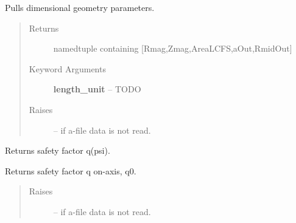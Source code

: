 \documentclass[letterpaper,10pt,english]{sphinxmanual}
\begin{document}
\begin{fulllineitems}
\begin{fulllineitems}
\begin{quote}
\begin{description}
\end{description}\end{quote}

\end{fulllineitems}


\begin{fulllineitems}
\label{eqtools:eqtools.eqdskreader.EqdskReader.getGeometry}
Pulls dimensional geometry parameters.
\begin{quote}\begin{description}
\item[{Returns}] \leavevmode
namedtuple containing {[}Rmag,Zmag,AreaLCFS,aOut,RmidOut{]}

\item[{Keyword Arguments}] \leavevmode
\textbf{length\_unit} --
TODO

\item[{Raises}] \leavevmode
{} -- 
if a-file data is not read.

\end{description}\end{quote}

\end{fulllineitems}


\begin{fulllineitems}
\label{eqtools:eqtools.eqdskreader.EqdskReader.getQProfile}
Returns safety factor q(psi).

\end{fulllineitems}


\begin{fulllineitems}
\label{eqtools:eqtools.eqdskreader.EqdskReader.getQ0}
Returns safety factor q on-axis, q0.
\begin{quote}\begin{description}
\item[{Raises}] \leavevmode
{} -- 
if a-file data is not read.

\end{description}\end{quote}


\end{fulllineitems}
\end{fulllineitems}
\end{document}

